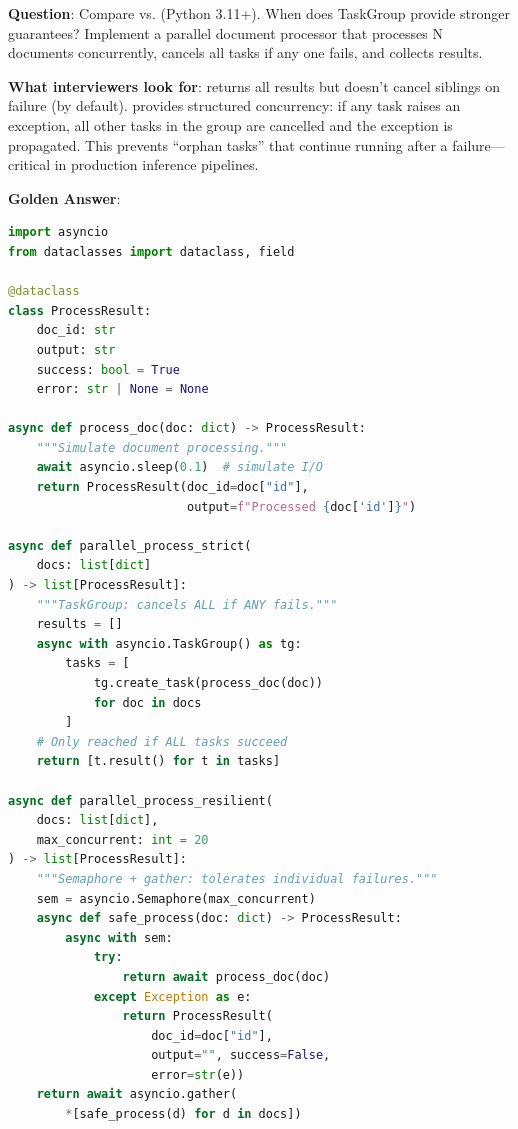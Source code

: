 \textbf{Question}: Compare  vs.  (Python 3.11+). When does TaskGroup provide stronger guarantees? Implement a parallel document processor that processes N documents concurrently, cancels all tasks if any one fails, and collects results.

\textbf{What interviewers look for}:  returns all results but doesn't cancel siblings on failure (by default).  provides structured concurrency: if any task raises an exception, all other tasks in the group are cancelled and the exception is propagated. This prevents ``orphan tasks'' that continue running after a failure---critical in production inference pipelines.

\textbf{Golden Answer}:

\begin{lstlisting}[language=Python]
import asyncio
from dataclasses import dataclass, field

@dataclass
class ProcessResult:
    doc_id: str
    output: str
    success: bool = True
    error: str | None = None

async def process_doc(doc: dict) -> ProcessResult:
    """Simulate document processing."""
    await asyncio.sleep(0.1)  # simulate I/O
    return ProcessResult(doc_id=doc["id"],
                         output=f"Processed {doc['id']}")

async def parallel_process_strict(
    docs: list[dict]
) -> list[ProcessResult]:
    """TaskGroup: cancels ALL if ANY fails."""
    results = []
    async with asyncio.TaskGroup() as tg:
        tasks = [
            tg.create_task(process_doc(doc))
            for doc in docs
        ]
    # Only reached if ALL tasks succeed
    return [t.result() for t in tasks]

async def parallel_process_resilient(
    docs: list[dict],
    max_concurrent: int = 20
) -> list[ProcessResult]:
    """Semaphore + gather: tolerates individual failures."""
    sem = asyncio.Semaphore(max_concurrent)
    async def safe_process(doc: dict) -> ProcessResult:
        async with sem:
            try:
                return await process_doc(doc)
            except Exception as e:
                return ProcessResult(
                    doc_id=doc["id"],
                    output="", success=False,
                    error=str(e))
    return await asyncio.gather(
        *[safe_process(d) for d in docs])
\end{lstlisting}

